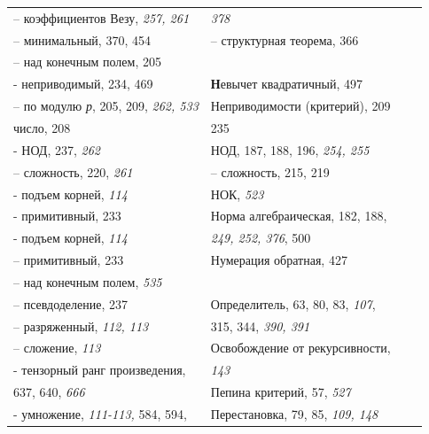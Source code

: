 \documentclass{mai_book}
\begin{document}
{\begin{tabular}{llcc}
			-- коэффициентов Везу, {\itshape 257, 261} & \emph{378} \\
			-- минимальный, 370, 454 & -- структурная теорема, 366 \\
			-- над конечным полем, 205 & \\
			- неприводимый, 234, 469 & \textbf{Н}евычет квадратичный, 497 \\
			-- по модулю \emph{р}, 205, 209, {\itshape 262, 533} & Неприводимости (критерий), 209\\
			число, 208 & 235 \\
			- НОД, 237, \emph{262} & НОД, 187, 188, 196, {\itshape 254, 255} \\
			-- сложность, 220, \emph{261} & -- сложность, 215, 219 \\
			- подъем корней, \emph{114} & НОК, \emph{523} \\
			- примитивный, 233 & Норма алгебраическая, 182, 188, \\
			- подъем корней, \emph{114} & {\itshape 249, 252, 376}, 500 \\
			-- примитивный, 233 & Нумерация обратная, 427 \\
			-- над конечным полем, \emph{535} & \\
			-- псевдоделение, 237 & Определитель, 63, 80, 83, \emph{107}, \\
		-- разряженный, {\itshape 112, 113} & 315, 344, {\itshape 390, 391} \\
			-- сложение, \emph{113} & Освобождение от рекурсивности,\\
			- тензорный ранг произведения, & \emph{143} \\
		637, 640, \emph{666} & Пепина критерий, 57, \emph{527} \\
			- умножение, {\itshape 111-113,} 584, 594, & Перестановка, 79, 85, {\itshape 109, 148} \\
		\end{tabular}
	
}
\end{document}
